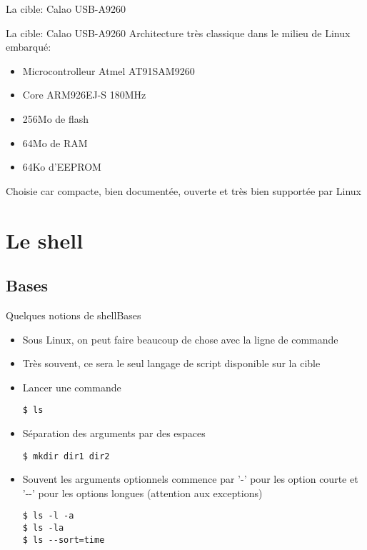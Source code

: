 \begin{frame}{La cible: Calao USB-A9260}
  \begin{center}
    \hspace{1cm}
  \end{center}
\end{frame}

\begin{frame}{La cible: Calao USB-A9260}
  Architecture très classique dans le milieu de Linux embarqué:
  \begin{itemize}
  \item Microcontrolleur Atmel AT91SAM9260
  \item Core ARM926EJ-S 180MHz
  \item 256Mo de flash
  \item 64Mo de RAM
  \item 64Ko d'EEPROM
  \end{itemize}
  Choisie  car  compacte,  bien   documentée,  ouverte  et  très  bien
  supportée par Linux
\end{frame}

\section{Le shell}

\subsection{Bases}

\begin{frame}[fragile=singleslide]{Quelques notions de shell}{Bases}
  \begin{itemize}
  \item Sous Linux,  on peut faire beaucoup de chose  avec la ligne de
    commande
  \item Très souvent, ce sera le seul langage de script disponible sur
    la cible
  \item Lancer une commande
\begin{lstlisting}
$ ls
\end{lstlisting} %
  \item Séparation des arguments par des espaces
\begin{lstlisting}
$ mkdir dir1 dir2
\end{lstlisting} %
    \item Souvent  les arguments optionnels commence par  '-' pour les
      option courte et '-\--'  pour les options longues (attention aux
      exceptions)
\begin{lstlisting}
$ ls -l -a 
$ ls -la 
$ ls --sort=time
\end{lstlisting} %
  \end{itemize}
\end{frame}

